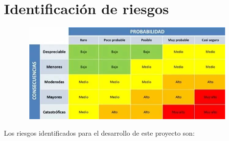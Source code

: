 \documentclass[a4paper,11pt]{report}
\begin{document}
\section*{Identificación de riesgos}
\begin{center}
    \includegraphics[height=5cm, width=16cm]{matriz_riesgos.jpg}
\end{center}


Los riesgos identificados para el desarrollo de este proyecto son:
\end{document}
